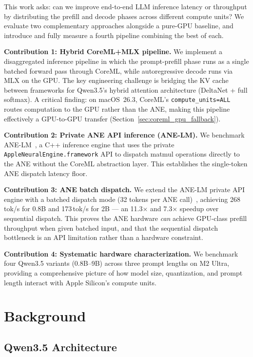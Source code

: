 \documentclass[11pt]{article}
\begin{document}
This work asks: can we improve end-to-end LLM inference latency or
throughput by distributing the prefill and decode phases across different
compute units?
We evaluate two complementary approaches alongside a pure-GPU baseline, and
introduce and fully measure a fourth pipeline combining the best of each.

\textbf{Contribution 1: Hybrid CoreML+MLX pipeline.}
We implement a disaggregated inference pipeline in which the prompt-prefill
phase runs as a single batched forward pass through CoreML,
while autoregressive decode runs via MLX on the GPU.
The key engineering challenge is bridging the KV cache between frameworks
for Qwen3.5's hybrid attention architecture (DeltaNet + full softmax).
A critical finding: on macOS~26.3, CoreML's \texttt{compute\_units=ALL}
routes computation to the GPU rather than the ANE, making this pipeline
effectively a GPU-to-GPU transfer (Section~\ref{sec:coreml_gpu_fallback}).

\textbf{Contribution 2: Private ANE API inference (ANE-LM).}
We benchmark ANE-LM~\cite{anelm}, a C++ inference engine that uses the
private \texttt{AppleNeuralEngine.framework} API to dispatch matmul
operations directly to the ANE without the CoreML abstraction layer.
This establishes the single-token ANE dispatch latency floor.

\textbf{Contribution 3: ANE batch dispatch.}
We extend the ANE-LM private API engine with a batched dispatch mode
(32 tokens per ANE call)~\cite{anelmbatch}, achieving 268\,tok/s for
0.8B and 173\,tok/s for 2B --- an 11.3$\times$ and 7.3$\times$ speedup
over sequential dispatch.
This proves the ANE hardware \emph{can} achieve GPU-class prefill
throughput when given batched input, and that the sequential dispatch
bottleneck is an API limitation rather than a hardware constraint.

\textbf{Contribution 4: Systematic hardware characterization.}
We benchmark four Qwen3.5 variants (0.8B--9B) across three prompt lengths
on M2 Ultra, providing a comprehensive picture of how model size,
quantization, and prompt length interact with Apple Silicon's compute units.

\section{Background}
\label{sec:background}

\subsection{Qwen3.5 Architecture}
\end{document}
